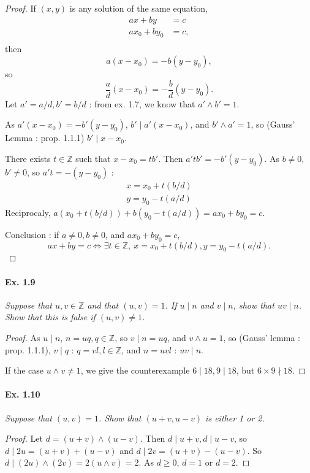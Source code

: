 \documentclass[11pt,a4paper]{article}
\newcommand{\Z}{\mathbb{Z}}
\begin{document}
{\begin{proof}
If $(x,y)$ is any solution of the same equation,
\begin{align*}
ax + by &= c\\
ax_0 +by_0 &= c,\\
\end{align*}
then $$a(x-x_0) = -b(y-y_0),$$
so $$\frac{a}{d}(x-x_0) = -\frac{b}{d} (y-y_0).$$
Let $a' = a/d, b' = b/d$ : from ex. 1.7, we know that $a'\wedge b' = 1$.

As $a'(x-x_0) =- b'(y-y_0)$, $b' \mid a'(x-x_0)$, and $b'\wedge a' = 1$, so (Gauss' Lemma : prop. 1.1.1) $b' \mid x-x_0$.

There exists $t \in \Z$ such that $x-x_0 = tb'$. Then $a'tb' = -b'(y-y_0)$. As $b \neq 0$, $b' \neq 0$, so $a't = -(y-y_0)$ :
\begin{align*}
x = x_0 + t(b/d)\\
y = y_0 - t (a/d)
\end{align*}
Reciprocaly, $a(x_0 +t(b/d)) + b(y_0 - t(a/d)) = ax_0 + by_0 =c$.

Conclusion : if $a\neq 0, b \neq 0$, and $ax_0+by_0 = c$,
$$ax+by = c \iff \exists t \in \Z,\ x = x_0 + t(b/d), y = y_0 - t (a/d).$$
\end{proof}


\paragraph{Ex. 1.9}

{\it Suppose that $u, v \in \Z$ and that $(u, v) = 1$. If $u \mid n$ and $v\mid n$, show that $uv \mid n$. Show that this is false if $(u, v) \ne 1$.
}

\begin{proof}
As $u \mid n$, $n = uq,q \in \Z$, so $v \mid n = uq$, and $v \wedge u = 1$, so (Gauss' lemma : prop. 1.1.1), $v \mid q$ : $q = v l, l \in \Z$, and $n = uv l$ : $uv \mid n$.

If the case $u \wedge v \neq 1$, we give the counterexample $6 \mid 18,9 \mid 18$, but $6 \times 9 \nmid 18$.
\end{proof}

\paragraph{Ex. 1.10}

{\it Suppose that $(u, v) = 1$. Show that $(u+v, u-v)$ is either 1 or 2.
}

\begin{proof} Let $d = (u + v) \wedge (u- v)$. Then $d\mid u+v,d \mid u-v$, so $d \mid 2u = (u+v)+(u-v)$ and $d \mid 2v = (u+v) - (u-v)$. So $d \mid (2u) \wedge (2v) = 2(u\wedge v) = 2$. As $d\geq 0$, $d =1$ or $d = 2$.
\end{proof}

}
\end{document}
